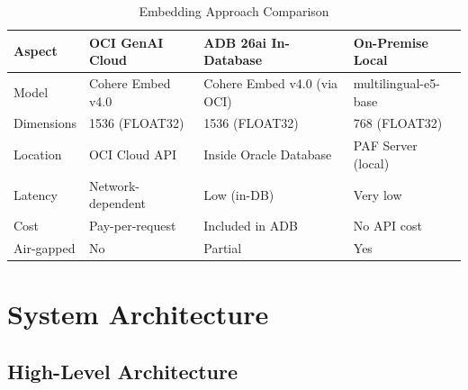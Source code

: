 \documentclass[12pt,a4paper]{article}
\begin{document}
\begin{table}[H]
\centering
\caption{Embedding Approach Comparison}
\label{tab:approach-comparison}
\begin{tabularx}{\textwidth}{l X X X}
\toprule
\textbf{Aspect} & \textbf{OCI GenAI Cloud} & \textbf{ADB 26ai In-Database} & \textbf{On-Premise Local} \\
\midrule
Model & Cohere Embed v4.0 & Cohere Embed v4.0 (via OCI) & multilingual-e5-base \\
Dimensions & 1536 (FLOAT32) & 1536 (FLOAT32) & 768 (FLOAT32) \\
Location & OCI Cloud API & Inside Oracle Database & PAF Server (local) \\
Latency & Network-dependent & Low (in-DB) & Very low \\
Cost & Pay-per-request & Included in ADB & No API cost \\
Air-gapped & No & Partial & Yes \\
\bottomrule
\end{tabularx}
\end{table}

\section{System Architecture}

\subsection{High-Level Architecture}
\end{document}

